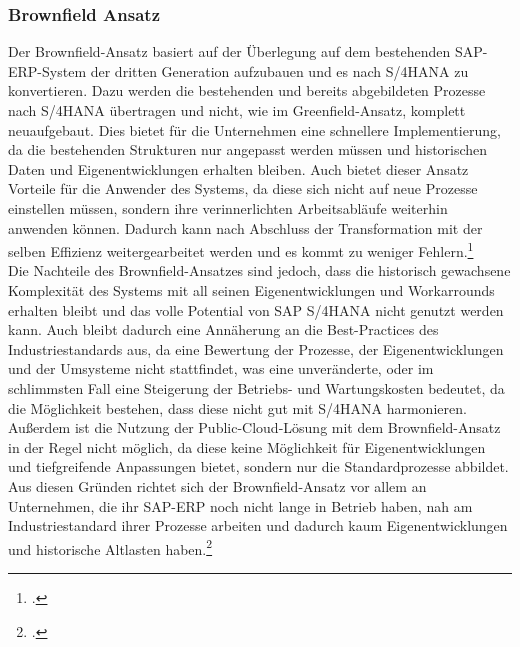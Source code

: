 \subsubsection{Brownfield Ansatz}
Der Brownfield-Ansatz basiert auf der Überlegung auf dem bestehenden SAP-ERP-System der dritten Generation aufzubauen und es nach S/4HANA zu konvertieren. Dazu werden die bestehenden und bereits abgebildeten Prozesse nach S/4HANA übertragen und nicht, wie im Greenfield-Ansatz, komplett neuaufgebaut. Dies bietet für die Unternehmen eine schnellere Implementierung, da die bestehenden Strukturen nur angepasst werden müssen und historischen Daten und Eigenentwicklungen erhalten bleiben. Auch bietet dieser Ansatz Vorteile für die Anwender des Systems, da diese sich nicht auf neue Prozesse einstellen müssen, sondern ihre verinnerlichten Arbeitsabläufe weiterhin anwenden können. Dadurch kann nach Abschluss der Transformation mit der selben Effizienz weitergearbeitet werden und es kommt zu weniger Fehlern.\footcite[Vgl.][]{gambit-transformation}
\\Die Nachteile des Brownfield-Ansatzes sind jedoch, dass die historisch gewachsene Komplexität des Systems mit all seinen Eigenentwicklungen und Workarrounds erhalten bleibt und das volle Potential von SAP S/4HANA nicht genutzt werden kann. Auch bleibt dadurch eine Annäherung an die Best-Practices des Industriestandards aus, da eine Bewertung der Prozesse, der Eigenentwicklungen und der Umsysteme nicht stattfindet, was eine unveränderte, oder im schlimmsten Fall eine Steigerung der Betriebs- und Wartungskosten bedeutet, da die Möglichkeit bestehen, dass diese nicht gut mit S/4HANA harmonieren. Außerdem ist die Nutzung der Public-Cloud-Lösung mit dem Brownfield-Ansatz in der Regel nicht möglich, da diese keine Möglichkeit für Eigenentwicklungen und tiefgreifende Anpassungen bietet, sondern nur die Standardprozesse abbildet. Aus diesen Gründen richtet sich der Brownfield-Ansatz vor allem an Unternehmen, die ihr SAP-ERP noch nicht lange in Betrieb haben, nah am Industriestandard ihrer Prozesse arbeiten und dadurch kaum Eigenentwicklungen und historische \glqq{}Altlasten\grqq{} haben.\footcite[Vgl.][]{gambit-transformation}

